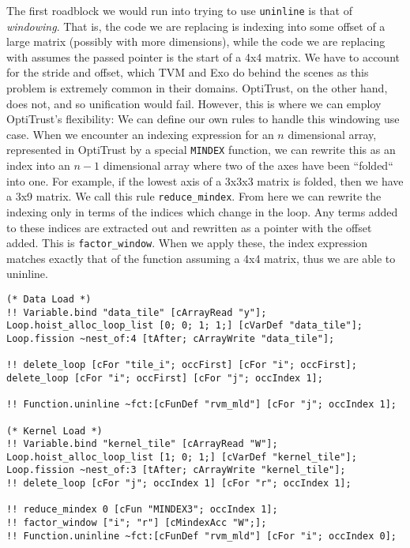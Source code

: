 \documentclass[acmsmall, nonacm=true]{acmart}
\begin{document}
The first roadblock we would run into trying to use \verb|uninline| is that of \textit{windowing}. That is, the code we are replacing is indexing into some offset of a large matrix (possibly with more dimensions), while the code we are replacing with assumes the passed pointer is the start of a 4x4 matrix. We have to account for the stride and offset, which TVM and Exo do behind the scenes as this problem is extremely common in their domains. OptiTrust, on the other hand, does not, and so unification would fail. However, this is where we can employ OptiTrust's flexibility: We can define our own rules to handle this windowing use case. When we encounter an indexing expression for an $n$ dimensional array, represented in OptiTrust by a special \verb|MINDEX| function, we can rewrite this as an index into an $n-1$ dimensional array where two of the axes have been ``folded`` into one. For example, if the lowest axis of a 3x3x3 matrix is folded, then we have a 3x9 matrix. We call this rule \verb|reduce_mindex|. From here we can rewrite the indexing only in terms of the indices which change in the loop. Any terms added to these indices are extracted out and rewritten as a pointer with the offset added. This is \verb|factor_window|. When we apply these, the index expression matches exactly that of the function assuming a 4x4 matrix, thus we are able to uninline.
\begin{listing}
    \begin{verbatim}
(* Data Load *)
!! Variable.bind "data_tile" [cArrayRead "y"];
Loop.hoist_alloc_loop_list [0; 0; 1; 1;] [cVarDef "data_tile"];
Loop.fission ~nest_of:4 [tAfter; cArrayWrite "data_tile"];

!! delete_loop [cFor "tile_i"; occFirst] [cFor "i"; occFirst];
delete_loop [cFor "i"; occFirst] [cFor "j"; occIndex 1];

!! Function.uninline ~fct:[cFunDef "rvm_mld"] [cFor "j"; occIndex 1];

(* Kernel Load *)
!! Variable.bind "kernel_tile" [cArrayRead "W"];
Loop.hoist_alloc_loop_list [1; 0; 1;] [cVarDef "kernel_tile"];
Loop.fission ~nest_of:3 [tAfter; cArrayWrite "kernel_tile"];
!! delete_loop [cFor "j"; occIndex 1] [cFor "r"; occIndex 1];

!! reduce_mindex 0 [cFun "MINDEX3"; occIndex 1];
!! factor_window ["i"; "r"] [cMindexAcc "W";];
!! Function.uninline ~fct:[cFunDef "rvm_mld"] [cFor "i"; occIndex 0];
    \end{verbatim}
    \caption{Staging and offloading of data and kernel loads.}
    \label{lst:conv1d_optitrust_data_kernel}
    \end{listing}
\end{document}
